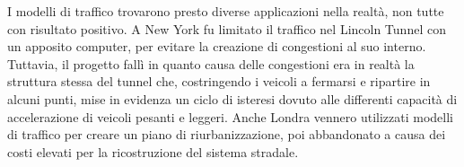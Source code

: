 \documentclass[../main.tex]{subfiles}
\begin{document}
I modelli di traffico trovarono presto diverse applicazioni nella realt\`a, non tutte con risultato positivo.
A New York fu limitato il traffico nel Lincoln Tunnel con un apposito computer, per evitare la creazione di congestioni al suo interno.
Tuttavia, il progetto fall\`i in quanto causa delle congestioni era in realt\`a la struttura stessa del tunnel che, costringendo i veicoli a fermarsi e ripartire in alcuni punti, mise in evidenza un ciclo di isteresi dovuto alle differenti capacit\`a di accelerazione di veicoli pesanti e leggeri.
Anche Londra vennero utilizzati modelli di traffico per creare un piano di riurbanizzazione, poi abbandonato a causa dei costi elevati per la ricostruzione del sistema stradale.
\end{document}
